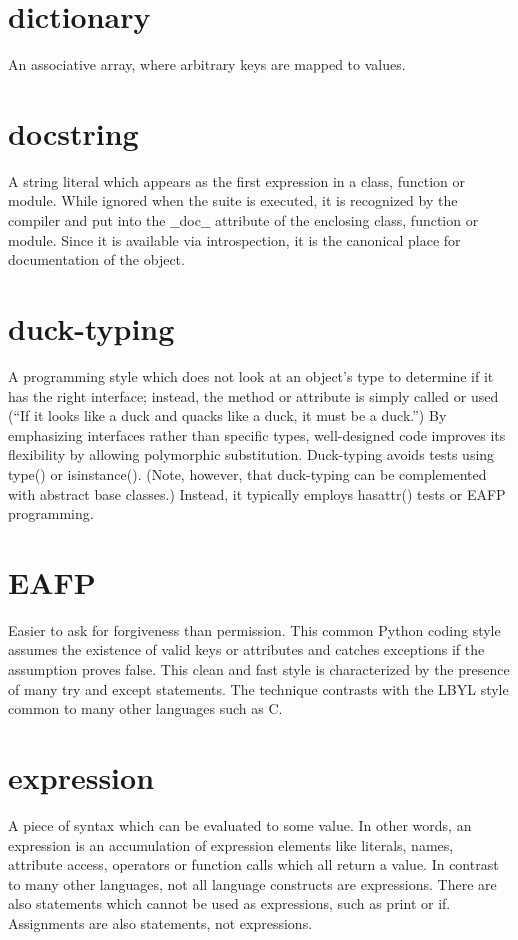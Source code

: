 \documentclass[12pt,a4paper,final,twoside,onecolumn,titlepage]{book}
\begin{document}
\section{dictionary}
An associative array, where arbitrary keys are mapped to values.

\section{docstring}
A string literal which appears as the first expression in a class, function or module. While ignored when the suite is executed, it is recognized by the compiler and put into the $\_\_$doc$\_\_$ attribute of the enclosing class, function or module. Since it is available via introspection, it is the canonical place for documentation of the object.

\section{duck-typing}
A programming style which does not look at an object’s type to determine if it has the right interface; instead, the method or attribute is simply called or used (“If it looks like a duck and quacks like a duck, it must be a duck.”) By emphasizing interfaces rather than specific types, well-designed code improves its flexibility by allowing polymorphic substitution. Duck-typing avoids tests using type() or isinstance(). (Note, however, that duck-typing can be complemented with abstract base classes.) Instead, it typically employs hasattr() tests or EAFP programming.

\section{EAFP}
Easier to ask for forgiveness than permission. This common Python coding style assumes the existence of valid keys or attributes and catches exceptions if the assumption proves false. This clean and fast style is characterized by the presence of many try and except statements. The technique contrasts with the LBYL style common to many other languages such as C.

\section{expression}
A piece of syntax which can be evaluated to some value. In other words, an expression is an accumulation of expression elements like literals, names, attribute access, operators or function calls which all return a value. In contrast to many other languages, not all language constructs are expressions. There are also statements which cannot be used as expressions, such as print or if. Assignments are also statements, not expressions.
\end{document}

